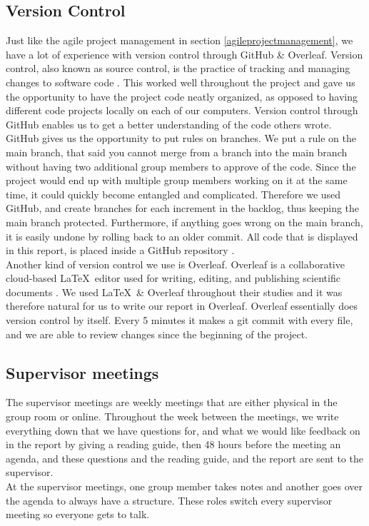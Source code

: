 \subsection{Version Control}
Just like the agile project management in section \ref{agileprojectmanagement}, we have a lot of experience with version control through GitHub \& Overleaf. Version control, also known as source control, is the practice of tracking and managing changes to software code \cite{whatisversioncontrol}. This worked well throughout the project and gave us the opportunity to have the project code neatly organized, as opposed to having different code projects locally on each of our computers. Version control through GitHub enables us to get a better understanding of the code others wrote. GitHub gives us the opportunity to put rules on branches. We put a rule on the main branch, that said you cannot merge from a branch into the main branch without having two additional group members to approve of the code. Since the project would end up with multiple group members working on it at the same time, it could quickly become entangled and complicated. Therefore we used GitHub, and create branches for each increment in the backlog, thus keeping the main branch protected. Furthermore, if anything goes wrong on the main branch, it is easily undone by rolling back to an older commit. All code that is displayed in this report, is placed inside a GitHub repository \cite{p4-project-rep}.\\

Another kind of version control we use is Overleaf. Overleaf is a collaborative cloud-based \LaTeX\ editor used for writing, editing, and publishing scientific documents \cite{overleafwikipedia}. We used \LaTeX\ \& Overleaf throughout their studies and it was therefore natural for us to write our report in Overleaf. Overleaf essentially does version control by itself. Every 5 minutes it makes a git commit with every file, and we are able to review changes since the beginning of the project.

\subsection{Supervisor meetings}
The supervisor meetings are weekly meetings that are either physical in the group room or online. Throughout the week between the meetings, we write everything down that we have questions for, and what we would like feedback on in the report by giving a reading guide, then 48 hours before the meeting an agenda, and these questions and the reading guide, and the report are sent to the supervisor.\\
At the supervisor meetings, one group member takes notes and another goes over the agenda to always have a structure. These roles switch every supervisor meeting so everyone gets to talk.

